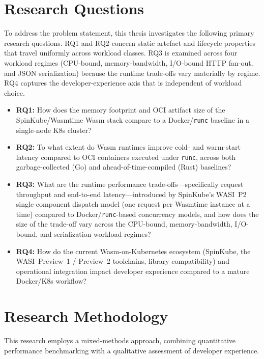 \section{Research Questions}
To address the problem statement, this thesis investigates the following primary research questions. RQ1 and RQ2 concern static artefact and lifecycle properties that travel uniformly across workload classes. RQ3 is examined across four workload regimes (\acs{CPU}-bound, memory-bandwidth, I/O-bound HTTP fan-out, and \acs{JSON} serialization) because the runtime trade-offs vary materially by regime. RQ4 captures the developer-experience axis that is independent of workload choice.
\begin{itemize}
    \item \begin{sloppypar}\textbf{RQ1:} How does the memory footprint and \acs{OCI} artifact size of the SpinKube/Wasmtime \acs{Wasm} stack compare to a Docker/\texttt{runc} baseline in a single-node \acs{K8s} cluster?\end{sloppypar}
    \item \begin{sloppypar}\textbf{RQ2:} To what extent do \acs{Wasm} runtimes improve cold- and warm-start latency compared to \acs{OCI} containers executed under \texttt{runc}, across both garbage-collected (Go) and ahead-of-time-compiled (Rust) baselines?\end{sloppypar}
    \item \begin{sloppypar}\textbf{RQ3:} What are the runtime performance trade-offs---specifically request throughput and end-to-end latency---introduced by SpinKube's \acs{WASI}~P2 single-component dispatch model (one request per Wasmtime instance at a time) compared to Docker/\texttt{runc}-based concurrency models, and how does the size of the trade-off vary across the \acs{CPU}-bound, memory-bandwidth, I/O-bound, and serialization workload regimes?\end{sloppypar}
    \item \textbf{RQ4:} How do the current \acs{Wasm}-on-Kubernetes ecosystem (SpinKube, the \acs{WASI}~Preview~1 / Preview~2 toolchains, library compatibility) and operational integration impact developer experience compared to a mature Docker/\acs{K8s} workflow?
\end{itemize}

\section{Research Methodology}
This research employs a mixed-methods approach, combining quantitative performance benchmarking with a qualitative assessment of developer experience.


